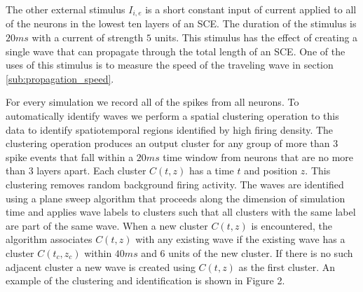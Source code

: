 \documentclass[12pt]{article}
\begin{document}
The other external stimulus $I_{i,e}$ is a short constant input of current applied to all of the neurons in the lowest ten layers of an SCE. 
The duration of the stimulus is $20 ms$ with a current of strength $5$ units. 
This stimulus has the effect of creating a single wave that can propagate through the total length of an SCE.
One of the uses of this stimulus is to measure the speed of the traveling wave in section \ref{sub:propagation_speed}.

For every simulation we record all of the spikes from all neurons. 
To automatically identify waves we perform a spatial clustering operation to this data to identify spatiotemporal regions identified by high firing density. 
The clustering operation produces an output cluster for any group of more than $3$ spike events that fall within a $20ms$ time window from neurons that are no more than $3$ layers apart.
Each cluster $C(t,z)$ has a time $t$ and position $z$.
This clustering removes random background firing activity. 
The waves are identified using a plane sweep algorithm that proceeds along the dimension of simulation time and applies wave labels to clusters such that all clusters with the same label are part of the same wave.
When a new cluster $C(t,z)$ is encountered, the algorithm associates $C(t,z)$ with any existing wave if the existing wave has a cluster $C(t_c,z_c)$ within $40 ms$ and $6$ units of the new cluster.
If there is no such adjacent cluster a new wave is created using $C(t,z)$ as the first cluster.
An example of the clustering and identification is shown in Figure 2.
\end{document}
